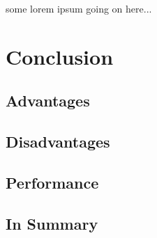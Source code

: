 \documentclass[titlepage, a4paper, 11pt]{scrartcl}
\begin{document}
            some lorem ipsum going on here...


    \section{Conclusion}

        \subsection{Advantages}


        \subsection{Disadvantages}


        \subsection{Performance}
    


        \subsection{In Summary}

      

            
    
\end{document}
